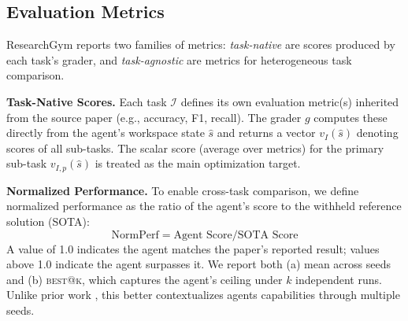 \documentclass[11pt]{article}
\let\cite\citep
\newcommand{\kw}[1]{{\textsc{\MakeLowercase{#1}}}}
\theoremstyle{plain}
\theoremstyle{definition}
\theoremstyle{remark}
\begin{document}
\subsection{Evaluation Metrics}
\label{sec:eval-metrics}

ResearchGym reports two families of metrics: \emph{task-native} are scores produced by each task's grader, and \emph{task-agnostic} are metrics for heterogeneous task comparison.


\textbf{Task-Native Scores.}
Each task $\mathcal{I}$ defines its own evaluation metric(s) inherited from the source paper (e.g., accuracy, F1, recall).
The grader $g$ computes these directly from the agent's workspace state $\hat{s}$ and returns a vector ${v}_{I}(\hat{s})$ denoting scores of all sub-tasks. The scalar score (average over metrics) 
for the primary sub-task $v_{I,p}(\hat{s})$ is treated as the main optimization target. 

\textbf{Normalized Performance.}
To enable cross-task comparison, we define normalized performance as the ratio of the agent's score to the withheld reference solution (SOTA):
\begin{equation}
\text{NormPerf} = \text{Agent Score}/\text{SOTA Score}
\end{equation}
A value of 1.0 indicates the agent matches the paper's reported result; values above 1.0 indicate the agent surpasses it. We report both (a) mean across seeds and (b) \kw{Best@k}, which captures the agent's ceiling under $k$ independent runs. Unlike prior work \cite{wu2025innovatorbenchevaluatingagentsability}, this better contextualizes agents capabilities through multiple seeds.
\end{document}
